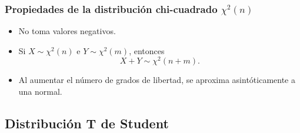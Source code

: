 \begin{frame}
\frametitle{Propiedades de la distribución chi-cuadrado $\chi^2(n)$}
\begin{itemize}
\item No toma valores negativos.
\item Si $X\sim \chi^2(n)$ e $Y\sim \chi^2(m)$, entonces
\[
X+Y \sim \chi^2(n+m).
\]
\item Al aumentar el número de grados de libertad, se aproxima asintóticamente a una normal.
\end{itemize}

\end{frame}


\subsection{Distribución T de Student}

